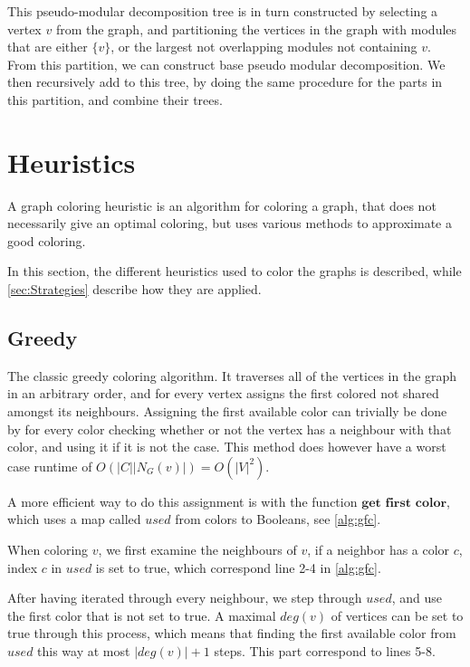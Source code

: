 \documentclass[a4paper]{article}
\begin{document}
This pseudo-modular decomposition tree is in turn constructed by selecting a
vertex $v$ from the graph, and partitioning the vertices in the graph with
modules that are either $\{v\}$, or the largest not overlapping modules
not containing $v$. From this partition, we can construct base pseudo modular
decomposition. We then recursively add to this tree, by doing the same procedure
for the parts in this partition, and combine their trees.

\section{Heuristics}
\label{sec:Heuristics}

A graph coloring heuristic is an algorithm for coloring a graph, that does not
necessarily give an optimal coloring, but uses various methods to approximate a
good coloring.


In this section, the different heuristics used to color the graphs is described,
while \autoref{sec:Strategies} describe how they are applied.
\subsection{Greedy}


The classic greedy coloring algorithm. It traverses all of the vertices in the graph
in an arbitrary order, and for every vertex assigns the first colored not shared
amongst its neighbours. Assigning the first available color can trivially be done
by for every color checking whether or not the vertex has a neighbour with that color,
and using it if it is not the case. This method does however
have a worst case runtime of $O(|C||N_G(v)|) = O(|V|^2)$. 

A more efficient way to do this assignment is with the function 
$\textbf{get first color}$, 
which uses a map called $used$ from colors to Booleans, see
\autoref{alg:gfc}.

When coloring $v$, we first examine the
neighbours of $v$, if a neighbor has a color $c$, index $c$ in $used$ is set to
true, which correspond line 2-4 in \autoref{alg:gfc}. 

After having iterated through every neighbour, we step through $used$, and use
the first color that is not set to true. A maximal $deg(v)$ of vertices can be
set to true through this process, which means that finding the first available
color from $used$ this way at most  $|deg(v)|+1$ steps. This part correspond to
lines 5-8.
\end{document}
